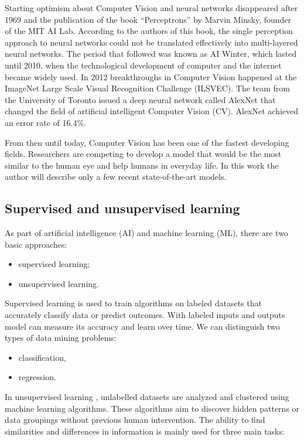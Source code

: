 \documentclass[
]{krantz}
\providecommand{\tightlist}{%
  \setlength{\itemsep}{0pt}\setlength{\parskip}{0pt}}
\begin{document}
Starting optimism about Computer Vision and neural networks disappeared after 1969 and the publication of the book ``Perceptrons'' by Marvin Minsky, founder of the MIT AI Lab. According to the authors of this book, the single perception approach to neural networks could not be translated effectively into multi-layered neural networks. The period that followed was known as AI Winter, which lasted until 2010, when the technological development of computer and the internet became widely used. In 2012 breakthroughs in Computer Vision happened at the ImageNet Large Scale Visual Recognition Challenge (ILSVEC). The team from the University of Toronto issued a deep neural network called AlexNet \citet{alexnet} that changed the field of artificial intelligent Computer Vision (CV). AlexNet achieved an error rate of 16.4\%.

From then until today, Computer Vision has been one of the fastest developing fields. Researchers are competing to develop a model that would be the most similar to the human eye and help humans in everyday life. In this work the author will describe only a few recent state-of-the-art models.

\hypertarget{supervised-and-unsupervised-learning}{%
\subsection{Supervised and unsupervised learning}\label{supervised-and-unsupervised-learning}}

As part of artificial intelligence (AI) and machine learning (ML), there are two basic approaches:

\begin{itemize}
\tightlist
\item
  supervised learning;
\item
  unsupervised learning.
\end{itemize}

Supervised learning \citet{supervised} is used to train algorithms on labeled datasets that accurately classify data or predict outcomes. With labeled inputs and outputs model can measure its accuracy and learn over time. We can distinguish two types of data mining problems:

\begin{itemize}
\tightlist
\item
  classification,
\item
  regression.
\end{itemize}

In unsupervised learning \citet{unsupervised}, unlabelled datasets are analyzed and clustered using machine learning algorithms. These algorithms aim to discover hidden patterns or data groupings without previous human intervention. The ability to find similarities and differences in information is mainly used for three main tasks:
\end{document}
